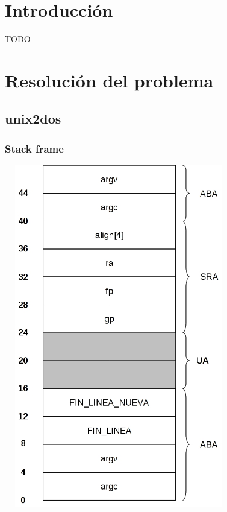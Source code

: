 \documentclass[a4paper,10pt]{article}
\begin{document}

\setcounter{page}{2}

\newpage
\thispagestyle{empty}
\tableofcontents

\newpage
\section{Introducci\'on}
  TODO

\section{Resoluci\'on del problema}

  \subsection{unix2dos}
    \subsubsection{Stack frame}
      \begin{center}
	\includegraphics[width=10cm, height=15cm]{DibujosStackFrame/stack-unix2dos(main).jpg}
      \end{center}
\end{document}
